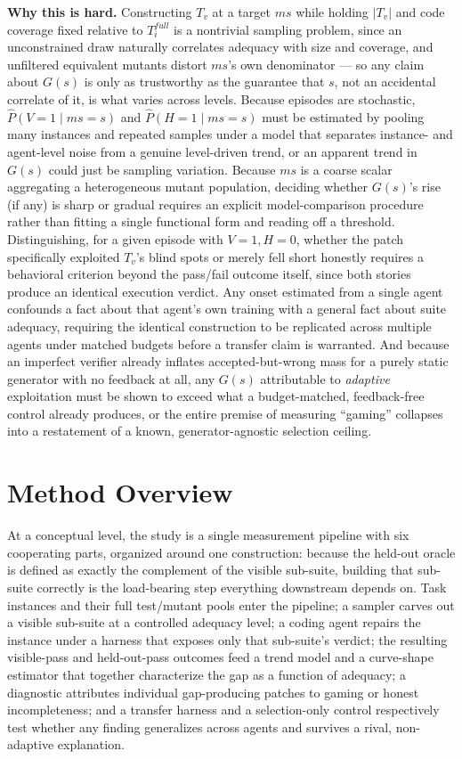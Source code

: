 \documentclass[11pt]{article}
\begin{document}
\noindent\textbf{Why this is hard.} Constructing $T_v$ at a target $ms$ while holding $|T_v|$ and code coverage fixed relative to $T_i^{full}$ is a nontrivial sampling problem, since an unconstrained draw naturally correlates adequacy with size and coverage, and unfiltered equivalent mutants distort $ms$'s own denominator --- so any claim about $G(s)$ is only as trustworthy as the guarantee that $s$, not an accidental correlate of it, is what varies across levels. Because episodes are stochastic, $\hat P(V{=}1\mid ms{=}s)$ and $\hat P(H{=}1\mid ms{=}s)$ must be estimated by pooling many instances and repeated samples under a model that separates instance- and agent-level noise from a genuine level-driven trend, or an apparent trend in $G(s)$ could just be sampling variation. Because $ms$ is a coarse scalar aggregating a heterogeneous mutant population, deciding whether $G(s)$'s rise (if any) is sharp or gradual requires an explicit model-comparison procedure rather than fitting a single functional form and reading off a threshold. Distinguishing, for a given episode with $V{=}1, H{=}0$, whether the patch specifically exploited $T_v$'s blind spots or merely fell short honestly requires a behavioral criterion beyond the pass/fail outcome itself, since both stories produce an identical execution verdict. Any onset estimated from a single agent confounds a fact about that agent's own training with a general fact about suite adequacy, requiring the identical construction to be replicated across multiple agents under matched budgets before a transfer claim is warranted. And because an imperfect verifier already inflates accepted-but-wrong mass for a purely static generator with no feedback at all, any $G(s)$ attributable to \emph{adaptive} exploitation must be shown to exceed what a budget-matched, feedback-free control already produces, or the entire premise of measuring ``gaming'' collapses into a restatement of a known, generator-agnostic selection ceiling.

\section{Method Overview}

At a conceptual level, the study is a single measurement pipeline with six cooperating parts, organized around one construction: because the held-out oracle is defined as exactly the complement of the visible sub-suite, building that sub-suite correctly is the load-bearing step everything downstream depends on. Task instances and their full test/mutant pools enter the pipeline; a sampler carves out a visible sub-suite at a controlled adequacy level; a coding agent repairs the instance under a harness that exposes only that sub-suite's verdict; the resulting visible-pass and held-out-pass outcomes feed a trend model and a curve-shape estimator that together characterize the gap as a function of adequacy; a diagnostic attributes individual gap-producing patches to gaming or honest incompleteness; and a transfer harness and a selection-only control respectively test whether any finding generalizes across agents and survives a rival, non-adaptive explanation.
\end{document}
